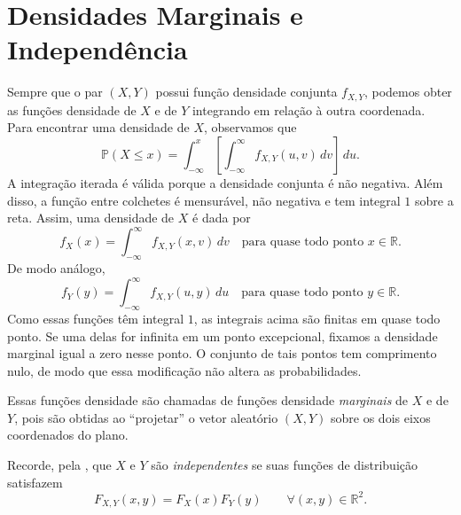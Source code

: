 \documentclass[12pt,portuguese]{article}
\theoremstyle{definition}
\theoremstyle{plainexercise}
\theoremstyle{starredexercise}
\theoremstyle{definition}
\begin{document}
\section{Densidades Marginais e Independência}\label{sec:densidades-marginais}
Sempre que o par $(X, Y)$ possui função densidade conjunta $f_{X,Y}$,
podemos obter as funções densidade de $X$ e de $Y$ integrando em relação
à outra coordenada. Para encontrar uma densidade de $X$, observamos que
\[
  \mathbb{P}(X \leqslant x)
  = \int_{-\infty}^{x}
  \left[\int_{-\infty}^{\infty} f_{X,Y}(u, v)\,dv\right]\,du.
\]
A integração iterada é válida porque a densidade conjunta é não negativa.
Além disso, a função entre colchetes é mensurável, não negativa e tem
integral $1$ sobre a reta. Assim, uma densidade de $X$ é dada por
\begin{equation}\label{eq:densidade-marginal-x}
  f_X(x) = \int_{-\infty}^{\infty} f_{X,Y}(x, v)\,dv
  \quad \text{para quase todo ponto } x \in \mathbb{R}.
\end{equation}
De modo análogo,
\begin{equation}\label{eq:densidade-marginal-y}
  f_Y(y) = \int_{-\infty}^{\infty} f_{X,Y}(u, y)\,du
  \quad \text{para quase todo ponto } y \in \mathbb{R}.
\end{equation}
Como essas funções têm integral $1$, as integrais acima são finitas em
quase todo ponto. Se uma delas for infinita em um ponto excepcional,
fixamos a densidade marginal igual a zero nesse ponto. O conjunto de tais
pontos tem comprimento nulo, de modo que essa modificação não altera as
probabilidades.

Essas funções densidade são chamadas de funções densidade \emph{marginais}
de $X$ e de $Y$, pois são obtidas ao ``projetar'' o vetor aleatório
$(X, Y)$ sobre os dois eixos coordenados do plano.


\bigskip

Recorde, pela ,
que $X$ e $Y$ são \emph{independentes} se suas funções de distribuição
satisfazem
\begin{equation}\label{eq:independencia-distribuicao-conjunta}
  F_{X,Y}(x, y) = F_X(x)F_Y(y) \qquad \forall (x,y) \in \mathbb{R}^2.
\end{equation}
\end{document}
